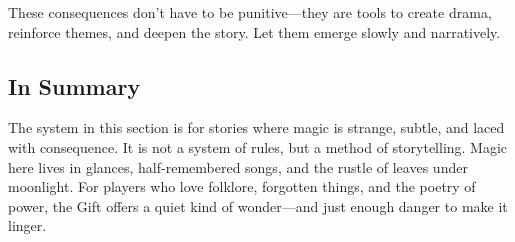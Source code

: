 These consequences don’t have to be punitive—they are tools to create drama, reinforce themes, and deepen the story. Let them emerge slowly and narratively.

\subsection{In Summary}

The system in this section is for stories where magic is strange, subtle, and laced with consequence. It is not a system of rules, but a method of storytelling. Magic here lives in glances, half-remembered songs, and the rustle of leaves under moonlight. For players who love folklore, forgotten things, and the poetry of power, the Gift offers a quiet kind of wonder—and just enough danger to make it linger.